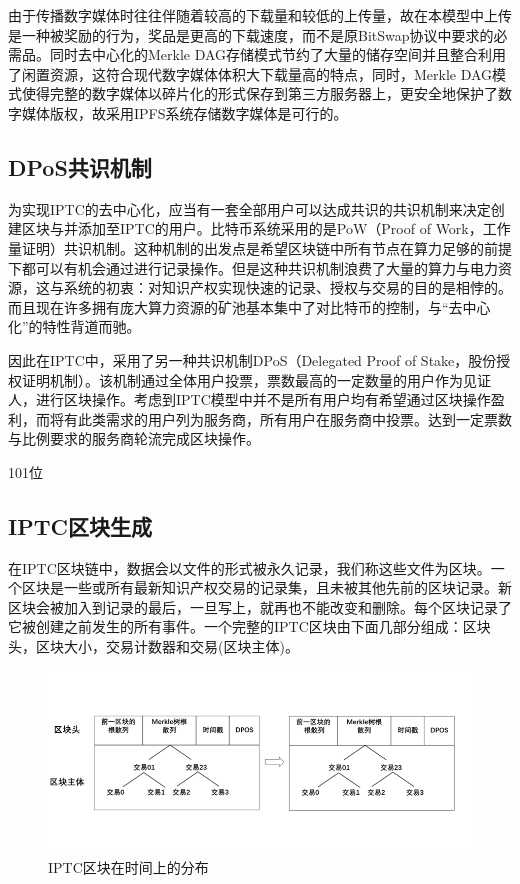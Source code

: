 \documentclass[withoutpreface,bwprint]{cumcmthesis} %
\begin{document}
由于传播数字媒体时往往伴随着较高的下载量和较低的上传量，故在本模型中上传是一种被奖励的行为，奖品是更高的下载速度，而不是原BitSwap协议中要求的必需品。同时去中心化的Merkle DAG存储模式节约了大量的储存空间并且整合利用了闲置资源，这符合现代数字媒体体积大下载量高的特点，同时，Merkle DAG模式使得完整的数字媒体以碎片化的形式保存到第三方服务器上，更安全地保护了数字媒体版权，故采用IPFS系统存储数字媒体是可行的。

\subsection{DPoS共识机制}
为实现IPTC的去中心化，应当有一套全部用户可以达成共识的共识机制来决定创建区块与并添加至IPTC的用户。比特币系统采用的是PoW（Proof of Work，工作量证明）共识机制。这种机制的出发点是希望区块链中所有节点在算力足够的前提下都可以有机会通过进行记录操作。但是这种共识机制浪费了大量的算力与电力资源，这与系统的初衷：对知识产权实现快速的记录、授权与交易的目的是相悖的。而且现在许多拥有庞大算力资源的矿池基本集中了对比特币的控制，与“去中心化”的特性背道而驰。

因此在IPTC中，采用了另一种共识机制DPoS（Delegated Proof of Stake，股份授权证明机制）。该机制通过全体用户投票，票数最高的一定数量的用户作为见证人，进行区块操作。考虑到IPTC模型中并不是所有用户均有希望通过区块操作盈利，而将有此类需求的用户列为服务商，所有用户在服务商中投票。达到一定票数与比例要求的服务商轮流完成区块操作。





101位




\subsection{IPTC区块生成}


在IPTC区块链中，数据会以文件的形式被永久记录，我们称这些文件为区块。一个区块是一些或所有最新知识产权交易的记录集，且未被其他先前的区块记录。新区块会被加入到记录的最后，一旦写上，就再也不能改变和删除。每个区块记录了它被创建之前发生的所有事件。一个完整的IPTC区块由下面几部分组成：区块头，区块大小，交易计数器和交易(区块主体)。

\begin{figure}[!h]
	\centering
	\includegraphics[width=1\textwidth]{IPTC.png}
	\caption{IPTC区块在时间上的分布}
\end{figure}
\end{document}
